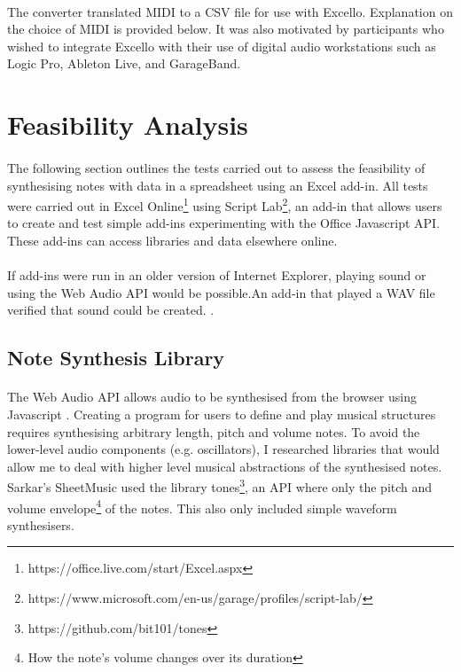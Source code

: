 \paragraph{} The converter translated MIDI to a CSV file for use with Excello. Explanation on the choice of MIDI is provided below. It was also motivated by participants who wished to integrate Excello with their use of digital audio workstations such as Logic Pro, Ableton Live, and GarageBand.

\section{Feasibility Analysis}

\paragraph{} The following section outlines the tests carried out to assess the feasibility of synthesising notes with data in a spreadsheet using an Excel add-in. All tests were carried out in Excel Online\footnote{https://office.live.com/start/Excel.aspx} using Script Lab\footnote{https://www.microsoft.com/en-us/garage/profiles/script-lab/}, an add-in that allows users to create and test simple add-ins experimenting with the Office Javascript API. These add-ins can access libraries and data elsewhere online.

\paragraph{} If add-ins were run in an older version of Internet Explorer, playing sound or using the Web Audio API would be possible.An add-in that played a WAV file verified that sound could be created. \cite{mozilla:webaudioapi}.

\subsection{Note Synthesis Library}

\paragraph{} The Web Audio API allows audio to be synthesised from the browser using Javascript \cite{mozilla:webaudioapi}. Creating a program for users to define and play musical structures requires synthesising arbitrary length, pitch and volume notes. To avoid the lower-level audio components (e.g. oscillators), I researched libraries that would allow me to deal with higher level musical abstractions of the synthesised notes. Sarkar's SheetMusic used the library tones\footnote{https://github.com/bit101/tones}, an API where only the pitch and volume envelope\footnote{How the note's volume changes over its duration} of the notes. This also only included simple waveform synthesisers.

